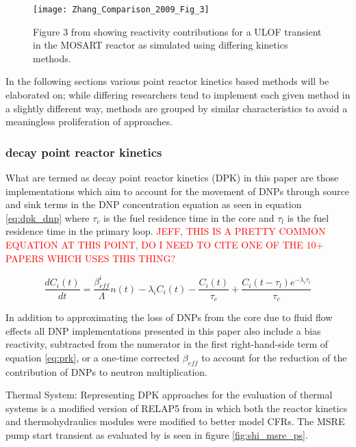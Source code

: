 \documentclass[review]{elsarticle}
\begin{document}
\begin{figure}[h]
   \centering
   \texttt{[image: Zhang\_Comparison\_2009\_Fig\_3]}
   \caption{Figure 3 from \cite{zhang_comparison_2009} showing reactivity contributions for a
   ULOF transient in the MOSART reactor as simulated using differing kinetics methods.} 
   \label{fig:zhang_prk_reac}
\end{figure}

In the following
sections various point reactor kinetics based methods will be elaborated on;
 while differing researchers
tend to implement each given method in a slightly different way, methods are
grouped by similar characteristics to avoid a meaningless proliferation of
approaches.

\subsubsection{decay point reactor kinetics} \label{sssec:dpk}
What are termed as
decay point reactor kinetics (DPK) in this paper are those implementations
which aim to account for the movement of DNPs through source and sink terms
in the DNP concentration equation as seen in equation \ref{eq:dpk_dnp}
where $\tau_{c}$ is the fuel residence time in the core and $\tau_{l}$ is the
fuel residence time in the primary loop.
\textcolor{red}{JEFF, THIS IS A PRETTY COMMON EQUATION AT THIS POINT,
DO I NEED TO CITE ONE OF THE 10+ PAPERS WHICH USES THIS THING?}

\begin{equation}
    \label{eq:dpk_dnp}
    \frac{dC_{i}(t)}{dt} = \frac{\beta_{eff}^{i}}{\Lambda} n(t) -
        \lambda_{i} C_{i}(t) - \frac{C_{i}(t)}{\tau_{c}} +
        \frac{C_{i}(t - \tau_{l}) e^{-\lambda_{i} \tau_{l}}}{\tau_{c}}
\end{equation}

In addition to approximating the loss of DNPs from the core due to fluid
flow effects all DNP implementations presented in this paper also include
a bias reactivity, subtracted from the numerator in the first right-hand-side
term of equation \ref{eq:prk}, or a one-time corrected $\beta_{eff}$ to account
for the reduction of the contribution of DNPs to neutron multiplication.

\par Thermal System: Representing DPK approaches for the evaluation of thermal
systems is a modified version of RELAP5 from \cite{shi_development_2016} in
which both the reactor kinetics and thermohydraulics modules were modified
to better model CFRs. The MSRE pump start transient as evaluated by
\cite{shi_development_2016} is seen in figure \ref{fig:shi_msre_ps}.
\end{document}
